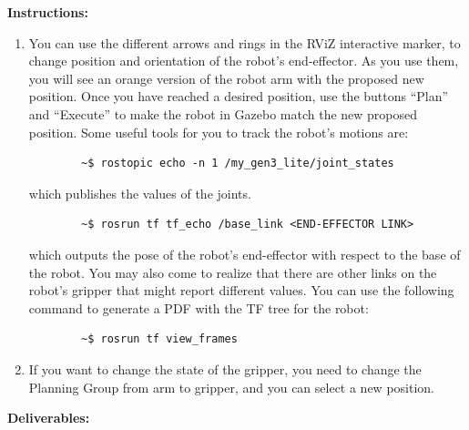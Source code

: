 \documentclass[12pt]{article}
\begin{document}
\textbf{Instructions:}

\begin{enumerate}
    \item You can use the different arrows and rings in the RViZ interactive marker, to change position and orientation of the robot’s end-effector. As you use them, you will see an orange version of the robot arm with the proposed new position. Once you have reached a desired position, use the buttons “Plan” and “Execute” to make the robot in Gazebo match the new proposed position. Some useful tools for you to track the robot’s motions are:
    \begin{verbatim}
        ~$ rostopic echo -n 1 /my_gen3_lite/joint_states
    \end{verbatim}
    which publishes the values of the joints.
    
    \begin{verbatim}
        ~$ rosrun tf tf_echo /base_link <END-EFFECTOR LINK>
    \end{verbatim}
    
    which outputs the pose of the robot’s end-effector with respect to the base of the robot. You may also come to realize that there are other links on the robot’s gripper that might report different values. You can use the following command to generate a PDF with the TF tree for the robot:
     \begin{verbatim}
        ~$ rosrun tf view_frames
    \end{verbatim}
    
    \item If you want to change the state of the gripper, you need to change the Planning Group from arm to gripper, and you can select a new position.
\end{enumerate}
\textbf{Deliverables:}
\end{document}
